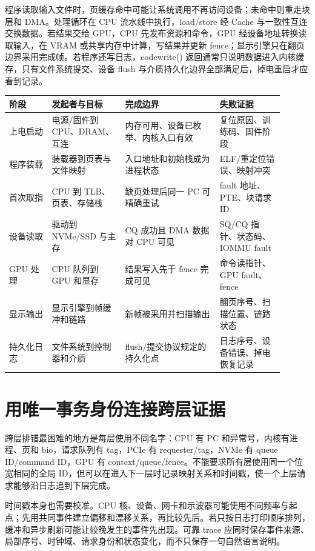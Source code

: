 程序读取输入文件时，页缓存命中可能让系统调用不再访问设备；未命中则重走块层和 DMA。处理循环在 CPU 流水线中执行，load/store 经 Cache 与一致性互连交换数据。若结果交给 GPU，CPU 先发布资源和命令，GPU 经设备地址转换读取输入，在 VRAM 或共享内存中计算，写结果并更新 fence；显示引擎只在翻页边界采用完成帧。若程序还写日志，code{write()} 返回通常只说明数据进入内核缓存，只有文件系统提交、设备 flush 与介质持久化边界全部满足后，掉电重启才应看到记录。

\begin{longtable}{L{0.14\linewidth}L{0.24\linewidth}L{0.31\linewidth}L{0.21\linewidth}}
\toprule
阶段 & 发起者与目标 & 完成边界 & 失败证据 \\
\midrule
上电启动 & 电源/固件到 CPU、DRAM、互连 & 内存可用、设备已枚举、内核入口有效 & 复位原因、训练码、固件阶段 \\
程序装载 & 装载器到页表与文件映射 & 入口地址和初始栈成为进程状态 & ELF/重定位错误、映射冲突 \\
首次取指 & CPU 到 TLB、页表、存储栈 & 缺页处理后同一 PC 可精确重试 & fault 地址、PTE、块请求 ID \\
设备读取 & 驱动到 NVMe/SSD 与主存 & CQ 成功且 DMA 数据对 CPU 可见 & SQ/CQ 指针、状态码、IOMMU fault \\
GPU 处理 & CPU 队列到 GPU 和显存 & 结果写入先于 fence 完成可见 & 命令读指针、GPU fault、fence \\
显示输出 & 显示引擎到帧缓冲和链路 & 新帧被采用并扫描输出 & 翻页序号、扫描位置、链路状态 \\
持久化日志 & 文件系统到控制器和介质 & flush/提交协议规定的持久化点 & 日志序号、设备错误、掉电恢复记录 \\
\bottomrule
\end{longtable}

\section{用唯一事务身份连接跨层证据}

跨层排错最困难的地方是每层使用不同名字：CPU 有 PC 和异常号，内核有进程、页和 bio，请求队列有 tag，PCIe 有 requester/tag，NVMe 有 queue ID/command ID，GPU 有 context/queue/fence。不能要求所有层使用同一个位宽相同的全局 ID，但可以在进入下一层时记录映射关系和时间戳，使一个上层请求能够沿日志追到下层完成。

时间戳本身也需要校准。CPU 核、设备、网卡和示波器可能使用不同频率与起点；先用共同事件建立偏移和漂移关系，再比较先后。若只按日志打印顺序排列，缓冲和异步刷新可能让较晚发生的事件先出现。可靠 trace 应同时保存事件来源、局部序号、时钟域、请求身份和状态变化，而不只保存一句自然语言说明。

